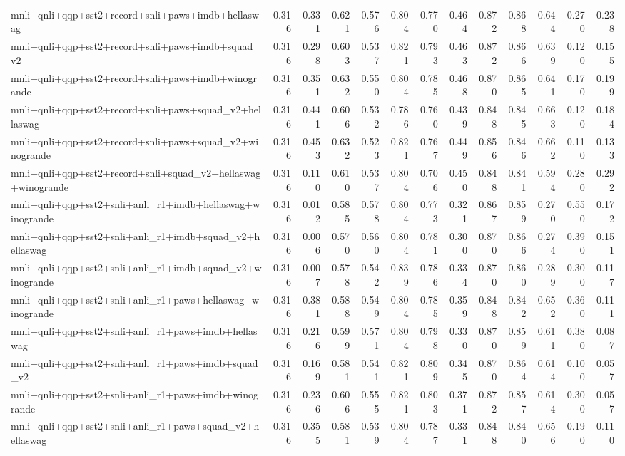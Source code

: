 \begin{table}[t]
\begin{tabular}{lrrrrrrrrrrrr}
    mnli+qnli+qqp+sst2+record+snli+paws+imdb+hellaswag & 0.316 & 0.331 & 0.621 & 0.576 & 0.804 & 0.770 & 0.464 & 0.872 & 0.868 & 0.644 & 0.270 & 0.238 \\
    mnli+qnli+qqp+sst2+record+snli+paws+imdb+squad\_v2 & 0.316 & 0.298 & 0.603 & 0.537 & 0.821 & 0.793 & 0.463 & 0.872 & 0.866 & 0.639 & 0.120 & 0.155 \\
    mnli+qnli+qqp+sst2+record+snli+paws+imdb+winogrande & 0.316 & 0.351 & 0.632 & 0.550 & 0.804 & 0.785 & 0.468 & 0.870 & 0.865 & 0.641 & 0.170 & 0.199 \\
    mnli+qnli+qqp+sst2+record+snli+paws+squad\_v2+hellaswag & 0.316 & 0.441 & 0.606 & 0.532 & 0.786 & 0.760 & 0.439 & 0.848 & 0.845 & 0.663 & 0.120 & 0.184 \\
    mnli+qnli+qqp+sst2+record+snli+paws+squad\_v2+winogrande & 0.316 & 0.453 & 0.632 & 0.523 & 0.821 & 0.767 & 0.449 & 0.856 & 0.846 & 0.662 & 0.110 & 0.133 \\
    mnli+qnli+qqp+sst2+record+snli+squad\_v2+hellaswag+winogrande & 0.316 & 0.110 & 0.610 & 0.537 & 0.804 & 0.706 & 0.450 & 0.848 & 0.841 & 0.594 & 0.280 & 0.292 \\
    mnli+qnli+qqp+sst2+snli+anli\_r1+imdb+hellaswag+winogrande & 0.316 & 0.012 & 0.585 & 0.578 & 0.804 & 0.773 & 0.321 & 0.867 & 0.859 & 0.270 & 0.550 & 0.172 \\
    mnli+qnli+qqp+sst2+snli+anli\_r1+imdb+squad\_v2+hellaswag & 0.316 & 0.006 & 0.570 & 0.560 & 0.804 & 0.781 & 0.300 & 0.870 & 0.866 & 0.274 & 0.390 & 0.151 \\
    mnli+qnli+qqp+sst2+snli+anli\_r1+imdb+squad\_v2+winogrande & 0.316 & 0.007 & 0.578 & 0.542 & 0.839 & 0.786 & 0.334 & 0.870 & 0.860 & 0.289 & 0.300 & 0.117 \\
    mnli+qnli+qqp+sst2+snli+anli\_r1+paws+hellaswag+winogrande & 0.316 & 0.381 & 0.588 & 0.549 & 0.804 & 0.785 & 0.359 & 0.848 & 0.842 & 0.652 & 0.360 & 0.111 \\
    mnli+qnli+qqp+sst2+snli+anli\_r1+paws+imdb+hellaswag & 0.316 & 0.216 & 0.599 & 0.571 & 0.804 & 0.798 & 0.330 & 0.870 & 0.859 & 0.611 & 0.380 & 0.087 \\
    mnli+qnli+qqp+sst2+snli+anli\_r1+paws+imdb+squad\_v2 & 0.316 & 0.169 & 0.581 & 0.541 & 0.821 & 0.809 & 0.345 & 0.870 & 0.864 & 0.614 & 0.100 & 0.057 \\
    mnli+qnli+qqp+sst2+snli+anli\_r1+paws+imdb+winogrande & 0.316 & 0.236 & 0.606 & 0.555 & 0.821 & 0.803 & 0.371 & 0.872 & 0.857 & 0.614 & 0.300 & 0.057 \\
    mnli+qnli+qqp+sst2+snli+anli\_r1+paws+squad\_v2+hellaswag & 0.316 & 0.355 & 0.581 & 0.539 & 0.804 & 0.787 & 0.331 & 0.848 & 0.840 & 0.656 & 0.190 & 0.110 \\

\end{tabular}
\end{table}
